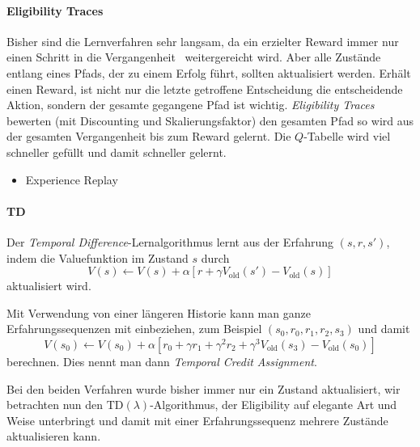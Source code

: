 \documentclass[ngerman]{../LaTeX-Templates/Paper/paper}
\newcommand{\enqo}[1]{\glqq #1\grqq\ }
\begin{document}
\paragraph{Eligibility Traces}
Bisher sind die Lernverfahren sehr langsam, da ein erzielter Reward immer nur einen Schritt \enqo{in die Vergangenheit} weitergereicht wird.
Aber alle Zustände entlang eines Pfads, der zu einem Erfolg führt, sollten aktualisiert werden. Erhält einen Reward, ist nicht nur die letzte getroffene Entscheidung die entscheidende Aktion, sondern der gesamte gegangene Pfad ist wichtig.
\emph{Eligibility Traces} bewerten (mit Discounting und Skalierungsfaktor) den gesamten Pfad so wird aus der gesamten Vergangenheit bis zum Reward gelernt. Die $Q$-Tabelle wird viel schneller gefüllt und damit schneller gelernt.



\begin{itemize}
	\item Experience Replay
\end{itemize}
\paragraph{TD}
Der \emph{Temporal Difference}-Lernalgorithmus lernt aus der Erfahrung $(s,r,s')$, indem die Valuefunktion im Zustand $s$ durch
\begin{equation*}
	V(s)\leftarrow V(s)+\alpha [r+\gamma V_{\text{old}}(s')-V_{\text{old}}(s)]
\end{equation*}
aktualisiert wird.

Mit Verwendung von einer längeren Historie kann man ganze Erfahrungssequenzen mit einbeziehen, zum Beispiel $(s_0,r_0,r_1,r_2,s_3)$ und damit
\begin{equation*}
	V(s_0)\leftarrow V(s_0)+\alpha [r_0+\gamma r_1+\gamma^2r_2+\gamma^3 V_{\text{old}}(s_3)-V_{\text{old}}(s_0)]
\end{equation*}
berechnen. Dies nennt man dann \emph{Temporal Credit Assignment}.

Bei den beiden Verfahren wurde bisher immer nur ein Zustand aktualisiert, wir betrachten nun den $\mathrm{TD}(\lambda)$-Algorithmus, der Eligibility auf elegante Art und Weise unterbringt und damit mit einer Erfahrungssequenz mehrere Zustände aktualisieren kann.
\end{document}
